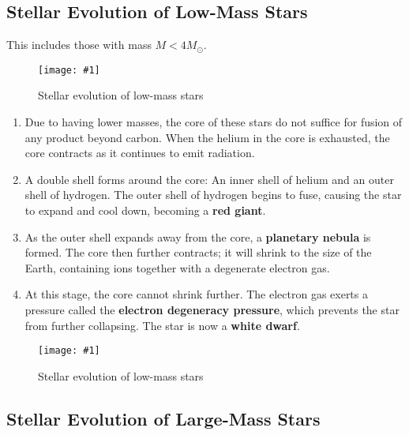 \documentclass[a4paper,12pt]{article}
\newcommand{\img}[4]{\begin{center}
  \begin{figure}[H]
    \centering
    \texttt{[image: \#1]}
    \caption{#3}
    \label{fig:#4}
  \end{figure}
\end{center}}
\begin{document}
\subsection{Stellar Evolution of Low-Mass Stars}

This includes those with mass $M < 4M_{\odot}$.
\img{lowmass1.png}{1}{Stellar evolution of low-mass stars}{lowmass1}
\begin{enumerate}
  \item Due to having lower masses, the core of these stars do not suffice for fusion of any product beyond carbon. When the helium in the core is exhausted, the core contracts as it continues to emit radiation.
  \item A double shell forms around the core: An inner shell of helium and an outer shell of hydrogen. The outer shell of hydrogen begins to fuse, causing the star to expand and cool down, becoming a \textbf{red giant}.
  \item As the outer shell expands away from the core, a \textbf{planetary nebula} is formed. The core then further contracts; it will shrink to the size of the Earth, containing ions together with a degenerate electron gas.
  \item At this stage, the core cannot shrink further. The electron gas exerts a pressure called the \textbf{electron degeneracy pressure}, which prevents the star from further collapsing. The star is now a \textbf{white dwarf}.
\end{enumerate}

\img{lowmass.png}{1}{Stellar evolution of low-mass stars}{lowmass}

\pagebreak

\subsection{Stellar Evolution of Large-Mass Stars}
\end{document}
